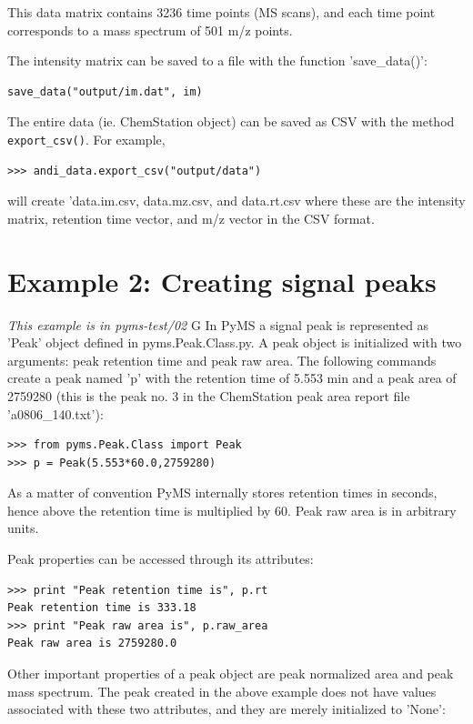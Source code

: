 \noindent
This data matrix contains 3236 time points (MS scans), and each time point
corresponds to a mass spectrum of 501 m/z points.

The intensity matrix can be saved to a file with the function 'save\_data()':

\begin{verbatim}
save_data("output/im.dat", im)
\end{verbatim}

The entire data (ie. ChemStation object) can be saved as CSV with the method
{\tt export\_csv()}. For example,

\begin{verbatim}
>>> andi_data.export_csv("output/data")
\end{verbatim}

\noindent
will create 'data.im.csv, data.mz.csv, and data.rt.csv where these are the
intensity matrix, retention time vector, and m/z vector in the CSV format.

\section{Example 2: Creating signal peaks}

\noindent
{\em This example is in pyms-test/02}
G
In PyMS a signal peak is represented as 'Peak' object defined in
pyms.Peak.Class.py. A peak object is initialized with two arguments:
peak retention time and peak raw area. The following commands create
a peak named 'p' with the retention time of 5.553 min and a peak area
of 2759280 (this is the peak no. 3 in the ChemStation peak area report
file 'a0806\_140.txt'):

\begin{verbatim}
>>> from pyms.Peak.Class import Peak
>>> p = Peak(5.553*60.0,2759280)
\end{verbatim}

\noindent
As a matter of convention PyMS internally stores retention times in seconds,
hence above the retention time is multiplied by 60. Peak raw area is in
arbitrary units.

Peak properties can be accessed through its attributes:

\begin{verbatim}
>>> print "Peak retention time is", p.rt
Peak retention time is 333.18
>>> print "Peak raw area is", p.raw_area
Peak raw area is 2759280.0
\end{verbatim}

\noindent
Other important properties of a peak object are peak normalized area
and peak mass spectrum. The peak created in the above example does
not have values associated with these two attributes, and they are
merely initialized to 'None':

